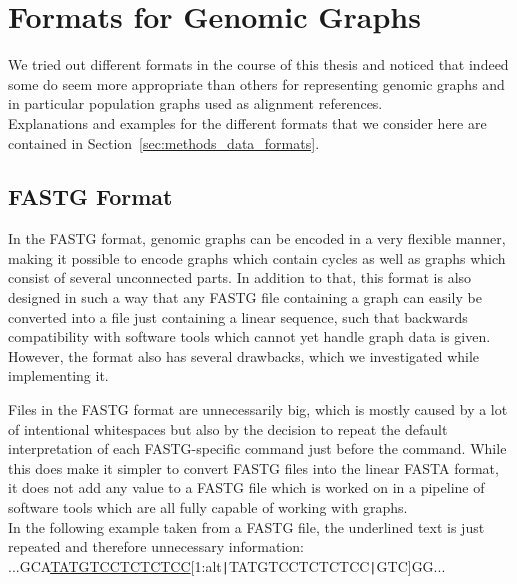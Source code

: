 \documentclass[a4paper,12pt,twoside,BCOR=10mm]{scrbook}
\def\pipe{\texttt{|}}
\begin{document}
\section{Formats for Genomic Graphs}
\label{sec:results_data_formats}
%

We tried out different formats in the course of this thesis
and noticed that indeed some do seem more appropriate than others
for representing genomic graphs
and in particular population graphs used as alignment references. \\
Explanations and examples for the different formats that we consider here
are contained in Section~\ref{sec:methods_data_formats}.

\subsection{FASTG Format}

In the FASTG format, genomic graphs can be encoded in a very flexible manner,
making it possible to encode graphs which contain cycles as well as graphs
which consist of several unconnected parts.
In addition to that, this format is also designed in such a way that any
FASTG file containing a graph can easily be converted into a file just containing
a linear sequence, such that backwards compatibility with software tools which
cannot yet handle graph data is given. \\
However, the format also has several drawbacks, which we investigated
while implementing it.

Files in the FASTG format are unnecessarily big, which is mostly caused
by a lot of intentional whitespaces but also by the decision to repeat the
default interpretation of each FASTG-specific command just before the command.
While this does make it simpler to convert FASTG files into the linear FASTA format,
it does not add any value to a FASTG file which is worked on in a pipeline of
software tools which are all fully capable of working with graphs. \\
In the following example taken from a FASTG file, the underlined
text is just repeated and therefore unnecessary information: \\
...GCA\underline{TATGTCCTCTCTCC}[1:alt\pipe TATGTCCTCTCTCC\pipe GTC]GG...
\end{document}
